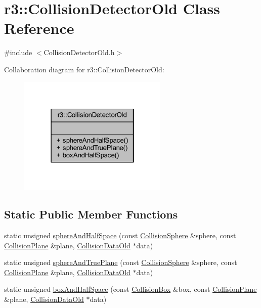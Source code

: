 \hypertarget{classr3_1_1_collision_detector_old}{}\section{r3\+:\+:Collision\+Detector\+Old Class Reference}
\label{classr3_1_1_collision_detector_old}


{\ttfamily \#include $<$Collision\+Detector\+Old.\+h$>$}



Collaboration diagram for r3\+:\+:Collision\+Detector\+Old\+:\nopagebreak
\begin{figure}[H]
\begin{center}
\leavevmode
\includegraphics[width=202pt]{classr3_1_1_collision_detector_old__coll__graph}
\end{center}
\end{figure}
\subsection*{Static Public Member Functions}
\begin{DoxyCompactItemize}
\item 
static unsigned \mbox{\hyperlink{classr3_1_1_collision_detector_old_afac2bf8c0034f33fee66979d69da76e7}{sphere\+And\+Half\+Space}} (const \mbox{\hyperlink{classr3_1_1_collision_sphere}{Collision\+Sphere}} \&sphere, const \mbox{\hyperlink{classr3_1_1_collision_plane}{Collision\+Plane}} \&plane, \mbox{\hyperlink{classr3_1_1_collision_data_old}{Collision\+Data\+Old}} $\ast$data)
\item 
static unsigned \mbox{\hyperlink{classr3_1_1_collision_detector_old_ac193fb110bfd2618ed61aa59b72c6877}{sphere\+And\+True\+Plane}} (const \mbox{\hyperlink{classr3_1_1_collision_sphere}{Collision\+Sphere}} \&sphere, const \mbox{\hyperlink{classr3_1_1_collision_plane}{Collision\+Plane}} \&plane, \mbox{\hyperlink{classr3_1_1_collision_data_old}{Collision\+Data\+Old}} $\ast$data)
\item 
static unsigned \mbox{\hyperlink{classr3_1_1_collision_detector_old_ad1fa9c247235130c96432fc3f5524e8f}{box\+And\+Half\+Space}} (const \mbox{\hyperlink{classr3_1_1_collision_box}{Collision\+Box}} \&box, const \mbox{\hyperlink{classr3_1_1_collision_plane}{Collision\+Plane}} \&plane, \mbox{\hyperlink{classr3_1_1_collision_data_old}{Collision\+Data\+Old}} $\ast$data)
\end{DoxyCompactItemize}


